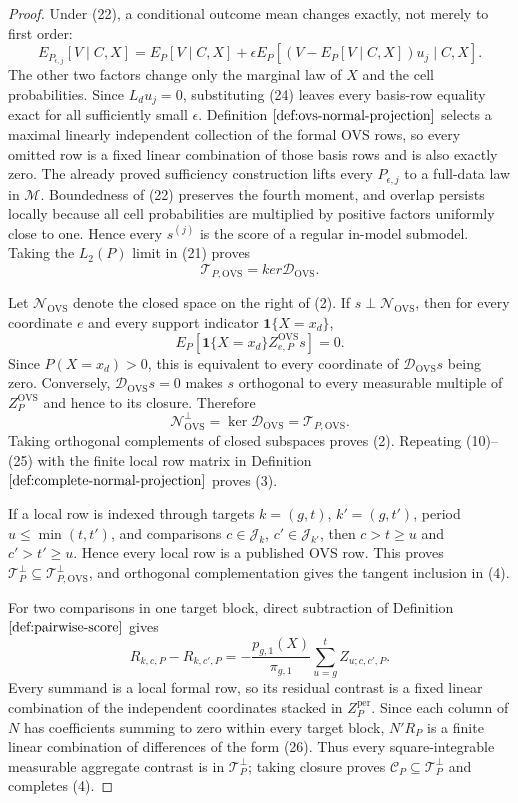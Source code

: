 \documentclass{article}
\begin{document}
\begin{proof}
Under (22), a conditional outcome mean changes exactly, not merely to first order:
\[
E_{P_{\epsilon,j}}[V\mid C,X]
=E_P[V\mid C,X]
+\epsilon E_P[(V-E_P[V\mid C,X])u_j\mid C,X].
\tag{24}
\]
The other two factors change only the marginal law of \(X\) and the cell probabilities.  Since \(L_du_j=0\), substituting (24) leaves every basis-row equality exact for all sufficiently small \(\epsilon\).  Definition \(\ref{def:ovs-normal-projection}\) selects a maximal linearly independent collection of the formal OVS rows, so every omitted row is a fixed linear combination of those basis rows and is also exactly zero.  The already proved sufficiency construction lifts every \(P_{\epsilon,j}\) to a full-data law in \(\mathcal M\).  Boundedness of (22) preserves the fourth moment, and overlap persists locally because all cell probabilities are multiplied by positive factors uniformly close to one.  Hence every \(s^{(j)}\) is the score of a regular in-model submodel.  Taking the \(L_2(P)\) limit in (21) proves
\[
\mathcal T_{P,\mathrm{OVS}}=ker\mathscr D_{\mathrm{OVS}}.
\tag{25}
\]

Let \(\mathcal N_{\mathrm{OVS}}\) denote the closed space on the right of (2).  If \(s\perp\mathcal N_{\mathrm{OVS}}\), then for every coordinate \(e\) and every support indicator \(\mathbf 1\{X=x_d\}\),
\[
E_P[\mathbf 1\{X=x_d\}Z^{\mathrm{OVS}}_{e,P}s]=0.
\]
Since \(P(X=x_d)>0\), this is equivalent to every coordinate of \(\mathscr D_{\mathrm{OVS}}s\) being zero.  Conversely, \(\mathscr D_{\mathrm{OVS}}s=0\) makes \(s\) orthogonal to every measurable multiple of \(Z_P^{\mathrm{OVS}}\) and hence to its closure.  Therefore
\[
\mathcal N_{\mathrm{OVS}}^\perp
=\ker\mathscr D_{\mathrm{OVS}}
=\mathcal T_{P,\mathrm{OVS}}.
\]
Taking orthogonal complements of closed subspaces proves (2).  Repeating (10)--(25) with the finite local row matrix in Definition \(\ref{def:complete-normal-projection}\) proves (3).

If a local row is indexed through targets \(k=(g,t)\), \(k'=(g,t')\), period \(u\le\min(t,t')\), and comparisons \(c\in\mathcal J_k\), \(c'\in\mathcal J_{k'}\), then \(c>t\ge u\) and \(c'>t'\ge u\).  Hence every local row is a published OVS row.  This proves \(\mathcal T_P^\perp\subseteq\mathcal T_{P,\mathrm{OVS}}^\perp\), and orthogonal complementation gives the tangent inclusion in (4).

For two comparisons in one target block, direct subtraction of Definition \(\ref{def:pairwise-score}\) gives
\[
R_{k,c,P}-R_{k,c',P}
=-\frac{p_{g,1}(X)}{\pi_{g,1}}
\sum_{u=g}^t Z_{u;c,c',P}.
\tag{26}
\]
Every summand is a local formal row, so its residual contrast is a fixed linear combination of the independent coordinates stacked in \(Z_P^{\mathrm{per}}\).  Since each column of \(N\) has coefficients summing to zero within every target block, \(N'R_P\) is a finite linear combination of differences of the form (26).  Thus every square-integrable measurable aggregate contrast is in \(\mathcal T_P^\perp\); taking closure proves \(\mathcal C_P\subseteq\mathcal T_P^\perp\) and completes (4).


\end{proof}
\end{document}

